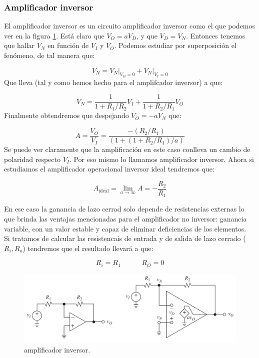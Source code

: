 \documentclass[12pt,a4paper]{article}
\numberwithin{equation}{section}
\numberwithin{figure}{section}
\newcommand{\tquad}{\quad \quad \quad}
\begin{document}
\subsubsection{Amplificador inversor}



El amplificador inversor es un circuito amplificador inversor como el que podemos ver en la figura \ref{Fig:1.4-Amplificador-Inversor}. Está claro que $V_O = a V_D$, y que $V_D = V_N$. Entonces tenemos que hallar $V_N$ en función de $V_I$ y $V_O$. Podemos estudiar por superposición el fenómeno, de tal manera que:

\begin{equation}
V_N = \left. V_N \right|_{V_O=0} +   \left. V_N \right|_{V_I=0}
\end{equation}
Que lleva (tal y como hemos hecho para el amplifcador inversor) a que:

\begin{equation}
V_N = \dfrac{1}{1+R_1/R_2} V_I + \dfrac{1}{1+R_2/R_1} V_O 
\end{equation}
Finalmente obtendremos que despejando $V_O = -  a V_N$ que:

\begin{equation}
A = \dfrac{V_O}{V_I} = \dfrac{-(R_2/R_1)}{(1+(1+R_2/R_1)/a)}
\end{equation}
Se puede ver claramente que la amplificación en este caso conlleva un cambio de polaridad  respecto $V_I$. Por eso mismo lo llamamos amplificador inversor. Ahora si estudiamos el amplificador operacional inversor ideal tendremos que:

\begin{equation}
A_{\mathrm{ideal}} = \lim_{a \rightarrow \infty} A = - \dfrac{R_2}{R_1}
\end{equation}

En ese caso la ganancia de lazo cerrad solo depende de resistencias externas lo que brinda las ventajas mencionadas para el amplificador no inversor: ganancia variable, con un valor estable y capaz de eliminar deficiencias de los elementos.  \\

Si tratamos de calcular las resistencais de entrada y de salida de lazo cerrado ($R_i, R_o$) tendremos que el resultado llevará a que:

\begin{equation}
R_i = R_1 \tquad R_O = 0
\end{equation}




\begin{figure}[t] \centering
\includegraphics[scale=0.4]{1.4-Amplificador-inversor.png}
\caption{amplificador inversor.}
\label{Fig:1.4-Amplificador-Inversor}
\end{figure} 
\end{document}
